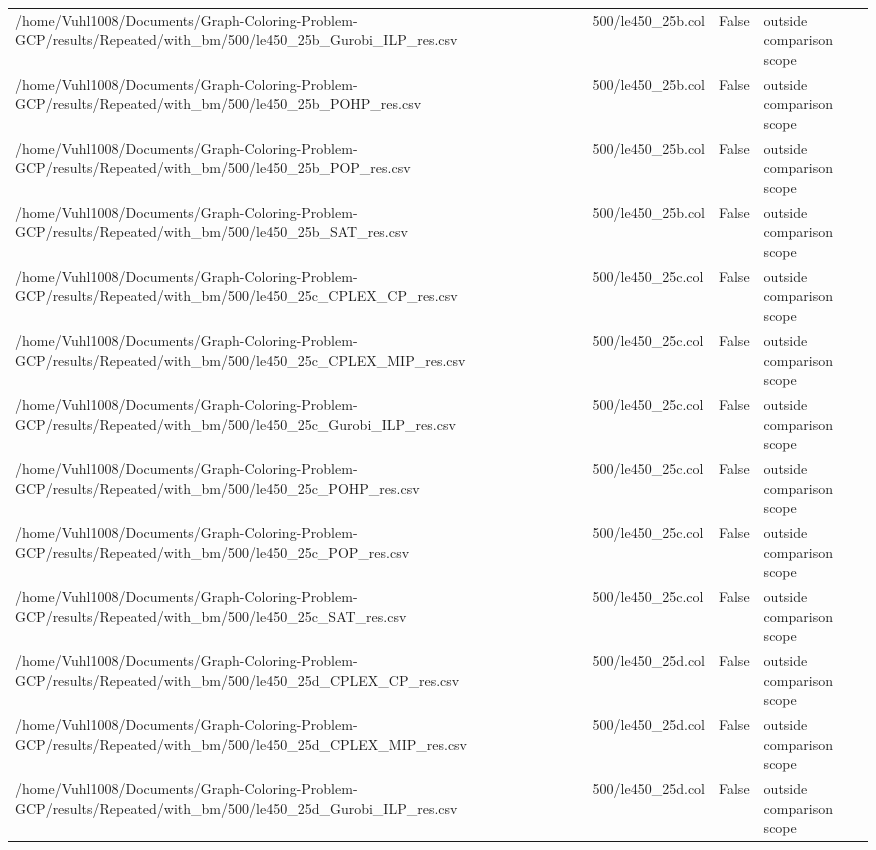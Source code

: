 \begin{table}[htbp]
\begin{tabular}{llll}
/home/Vuhl1008/Documents/Graph-Coloring-Problem-GCP/results/Repeated/with\_bm/500/le450\_25b\_Gurobi\_ILP\_res.csv & 500/le450\_25b.col & False & outside comparison scope \\
/home/Vuhl1008/Documents/Graph-Coloring-Problem-GCP/results/Repeated/with\_bm/500/le450\_25b\_POHP\_res.csv & 500/le450\_25b.col & False & outside comparison scope \\
/home/Vuhl1008/Documents/Graph-Coloring-Problem-GCP/results/Repeated/with\_bm/500/le450\_25b\_POP\_res.csv & 500/le450\_25b.col & False & outside comparison scope \\
/home/Vuhl1008/Documents/Graph-Coloring-Problem-GCP/results/Repeated/with\_bm/500/le450\_25b\_SAT\_res.csv & 500/le450\_25b.col & False & outside comparison scope \\
/home/Vuhl1008/Documents/Graph-Coloring-Problem-GCP/results/Repeated/with\_bm/500/le450\_25c\_CPLEX\_CP\_res.csv & 500/le450\_25c.col & False & outside comparison scope \\
/home/Vuhl1008/Documents/Graph-Coloring-Problem-GCP/results/Repeated/with\_bm/500/le450\_25c\_CPLEX\_MIP\_res.csv & 500/le450\_25c.col & False & outside comparison scope \\
/home/Vuhl1008/Documents/Graph-Coloring-Problem-GCP/results/Repeated/with\_bm/500/le450\_25c\_Gurobi\_ILP\_res.csv & 500/le450\_25c.col & False & outside comparison scope \\
/home/Vuhl1008/Documents/Graph-Coloring-Problem-GCP/results/Repeated/with\_bm/500/le450\_25c\_POHP\_res.csv & 500/le450\_25c.col & False & outside comparison scope \\
/home/Vuhl1008/Documents/Graph-Coloring-Problem-GCP/results/Repeated/with\_bm/500/le450\_25c\_POP\_res.csv & 500/le450\_25c.col & False & outside comparison scope \\
/home/Vuhl1008/Documents/Graph-Coloring-Problem-GCP/results/Repeated/with\_bm/500/le450\_25c\_SAT\_res.csv & 500/le450\_25c.col & False & outside comparison scope \\
/home/Vuhl1008/Documents/Graph-Coloring-Problem-GCP/results/Repeated/with\_bm/500/le450\_25d\_CPLEX\_CP\_res.csv & 500/le450\_25d.col & False & outside comparison scope \\
/home/Vuhl1008/Documents/Graph-Coloring-Problem-GCP/results/Repeated/with\_bm/500/le450\_25d\_CPLEX\_MIP\_res.csv & 500/le450\_25d.col & False & outside comparison scope \\
/home/Vuhl1008/Documents/Graph-Coloring-Problem-GCP/results/Repeated/with\_bm/500/le450\_25d\_Gurobi\_ILP\_res.csv & 500/le450\_25d.col & False & outside comparison scope \\

\end{tabular}
\end{table}
